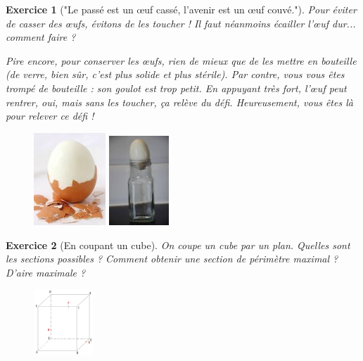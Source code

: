 \documentclass[12pt]{article}
\theoremstyle{break}
\newtheorem{exo}{Exercice}
\begin{document}
\begin{exo}["Le passé est un œuf cassé, l'avenir est un œuf couvé."]
Pour éviter de casser des œufs, évitons de les toucher ! Il faut néanmoins écailler l’œuf dur... comment faire ?

Pire encore, pour conserver les œufs, rien de mieux que de les mettre en bouteille (de verre, bien sûr, c'est plus solide et plus stérile). Par contre, vous vous êtes trompé de bouteille : son goulot est trop petit. En appuyant très fort, l’œuf peut rentrer, oui, mais sans les toucher, ça relève du défi. Heureusement, vous êtes là pour relever ce défi !

\begin{figure}[h!]
	\centering
    \includegraphics[width=0.24\textwidth]{OeufEcaille.jpg}
    \includegraphics[width=0.2\textwidth]{OeufEnBouteille.jpg}
\end{figure}
\end{exo}


\begin{exo}[En coupant un cube]
On coupe un cube par un plan. Quelles sont les sections possibles ? Comment obtenir une section de périmètre maximal ? D'aire maximale ?

\begin{figure}[h!]
	\centering
    \includegraphics[width=0.2\textwidth]{Cube.png}
    
\end{figure}
\end{exo}
\end{document}
